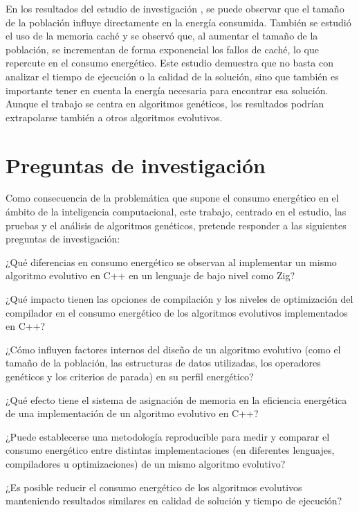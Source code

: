 En los resultados del estudio de investigación \cite{diaz2022population}, se puede observar que el tamaño de la población influye directamente en la energía consumida. También se estudió el uso de la memoria caché y se observó que, al aumentar el tamaño de la población, se incrementan de forma exponencial los fallos de caché, lo que repercute en el consumo energético. Este estudio demuestra que no basta con analizar el tiempo de ejecución o la calidad de la solución, sino que también es importante tener en cuenta la energía necesaria para encontrar esa solución. Aunque el trabajo se centra en algoritmos genéticos, los resultados podrían extrapolarse también a otros algoritmos evolutivos.
  
\section{Preguntas de investigación}

Como consecuencia de la problemática que supone el consumo energético en el ámbito de la inteligencia computacional, este trabajo, centrado en el estudio, las pruebas y el análisis de algoritmos genéticos, pretende responder a las siguientes preguntas de investigación:

¿Qué diferencias en consumo energético se observan al implementar un mismo algoritmo evolutivo en C++ en un lenguaje de bajo nivel como Zig?

¿Qué impacto tienen las opciones de compilación y los niveles de optimización del compilador en el consumo energético de los algoritmos evolutivos implementados en C++?

¿Cómo influyen factores internos del diseño de un algoritmo evolutivo (como el tamaño de la población, las estructuras de datos utilizadas, los operadores genéticos y los criterios de parada) en su perfil energético?

¿Qué efecto tiene el sistema de asignación de memoria en la eficiencia energética de una implementación de un algoritmo evolutivo en C++?

¿Puede establecerse una metodología reproducible para medir y comparar el consumo energético entre distintas implementaciones (en diferentes lenguajes, compiladores u optimizaciones) de un mismo algoritmo evolutivo?

¿Es posible reducir el consumo energético de los algoritmos evolutivos manteniendo resultados similares en calidad de solución y tiempo de ejecución?


